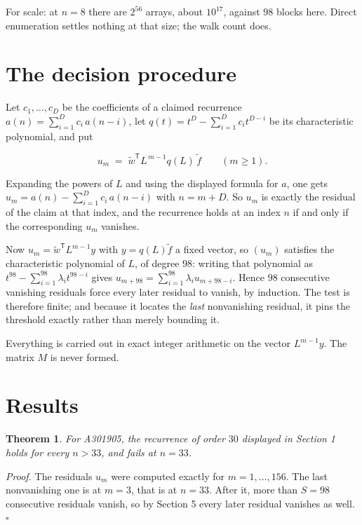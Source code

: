 \documentclass[11pt]{article}
\newtheorem{theorem}{Theorem}
\theoremstyle{definition}
\begin{document}
For scale: at $n = 8$ there are $2^{56}$ arrays, about $10^{17}$, against $98$ blocks here. Direct enumeration settles nothing at that size; the walk count does.

\section{The decision procedure}

Let $c_1,\dots,c_D$ be the coefficients of a claimed recurrence $a(n) = \sum_{i=1}^{D} c_i\,a(n-i)$, let $q(t) = t^{D} - \sum_{i=1}^{D} c_i t^{D-i}$ be its characteristic polynomial, and put

\[u_m \;=\; \tilde w^{\mathsf T} L^{\,m-1} q(L)\,\tilde f \qquad (m \ge 1).\]

Expanding the powers of $L$ and using the displayed formula for $a$, one gets $u_m = a(n) - \sum_{i=1}^{D} c_i\,a(n-i)$ with $n = m + D$. So $u_m$ is exactly the residual of the claim at that index, and the recurrence holds at an index $n$ if and only if the corresponding $u_m$ vanishes.

Now $u_m = \tilde w^{\mathsf T} L^{m-1} y$ with $y = q(L)\tilde f$ a fixed vector, so $(u_m)$ satisfies the characteristic polynomial of $L$, of degree $98$: writing that polynomial as $t^{98} - \sum_{i=1}^{98} \lambda_i t^{98-i}$ gives $u_{m+98} = \sum_{i=1}^{98} \lambda_i u_{m+98-i}$. Hence $98$ consecutive vanishing residuals force every later residual to vanish, by induction. The test is therefore finite; and because it locates the {\itshape last} nonvanishing residual, it pins the threshold exactly rather than merely bounding it.

Everything is carried out in exact integer arithmetic on the vector $L^{m-1}y$. The matrix $M$ is never formed.

\section{Results}

\begin{theorem} For A301905, the recurrence of order $30$ displayed in Section 1 holds for every $n > 33$, and fails at $n = 33$.\end{theorem}

{\itshape Proof.} The residuals $u_m$ were computed exactly for $m = 1,\dots,156$. The last nonvanishing one is at $m = 3$, that is at $n = 33$. After it, more than $S = 98$ consecutive residuals vanish, so by Section 5 every later residual vanishes as well. $\square$
\end{document}

